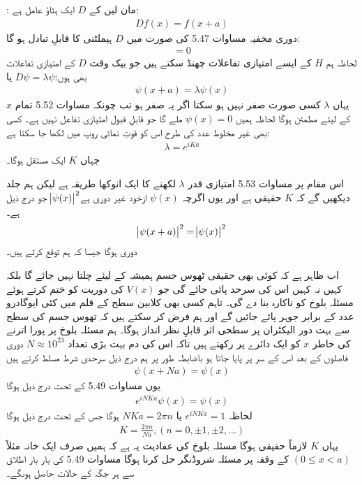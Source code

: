 \documentclass[leqno, b5paper]{khalid-urdu-book}
\begin{document}
: مان لیں کے $D$ ایک ہٹاؤ عامل ہے:
\begin{align}
	Df(x) = f(x+a)
\end{align}
دوری مخفیہ مساوات \num{5.47} کی صورت میں $D$ ہیملٹنی کا قابلِ تبادل ہو گا:
\begin{align}
	[D, H] = 0
\end{align}
لحاظہ ہم $H$ کے ایسے امتیازی تفاعلات چھنڈ سکتے ہیں جو بیک وقت $D$ کے امتیازی تفاعلات بھی ہوں:\(D\psi = \lambda\psi\) یا
\begin{align}
	\psi(x+a) = \lambda\psi(x)
\end{align}
یہاں $\lambda$ کسی صورت صفر نہیں ہو سکتا اگر یہ صفر ہو تب چونکہ مساوات \num{5.52} تمام $x$ کے لیئے مطمئن ہوگا لحاظہ ہمیں \(\psi(x) = 0\) ملے گا جو قابلِ قبول امتیازی تفاعل نہیں ہے۔ کسی بھی غیر مخلوط عدد کی طرح اس کو قوتِ نمائی روپ میں لکھا جا سکتا ہے: 
\begin{align}
	\lambda = e^{iKa}
\end{align}
جہاں $K$ ایک مستقل ہوگا۔

اس مقام پر مساوات \num{5.53} امتیازی قدر $\lambda$ لکھنے کا ایک انوکھا طریقہ ہے لیکن ہم جلد دیکھیں گے کہ $K$ حقیقی ہے اور یوں اگرچہ $\psi(x)$ ازخود غیر دوری ہے\(\abs{\psi(x)}^{2}\) جو درج ذیل ہے۔
\begin{align}
	\abs{\psi(x+a)}^{2} = \abs{\psi(x)}^{2}
\end{align}
دوری ہوگا جیسا کہ ہم توقع کرتے ہیں۔

اب ظاہر ہے کہ کوئی بھی حقیقی ٹھوس جسم ہمیشہ کے لیئے چلتا نہیں جائے گا بلکہ کہیں نہ کہیں اس کی سرحد پائی جائے گی جو $V(x)$ کی دوریت کو ختم کرتے ہوئے مسئلہ بلوخ کو ناکارہ بنا دے گی۔ تاہم کسی بھی کلابین سطح کے  قلم میں کئی ایوگادرو عدد کے برابر جوہر پائے جائیں گے اور ہم فرض کر سکتے ہیں کہ تھوس جسم کی سطح سے بہت دور الیکٹران پر سطحی اثر قابلِ نظر انداز ہوگا۔ ہم مسئلہ بلوخ پر پورا اترنے کی خاطر $x$ کو ایک دائرے پر رکھتے ہیں تاکہ اس کی دم بہت بڑی تعداد \(N\approx10^{23}\) دوری فاصلوں کے بعد اس کے سر پر پایا جاتا ہو باضابطہ طور پر ہم درج ذیل سرحدی شرط مسلط کرتے ہیں   
\begin{align}
	\psi(x+Na) = \psi(x)
\end{align}
یوں مساوات \num{5.49} کے تحت درج ذیل ہوگا
\begin{align*}
	e^{iNKa}\psi(x) = \psi(x)
\end{align*}
لحاظہ \(e^{iNKa} = 1\) یا \(NKa = 2\pi n\) ہوگا جس کے تحت درج ذیل ہوگا 
\begin{align}
	K = \frac{2\pi n}{Na}, (n = 0, \pm1, \pm2, \dots)
\end{align}
یہاں $K$ لازماً حقیقی ہوگا مسئلہ بلوخ کی عفادیت یہ ہے کہ ہمیں صرف ایک خانہ مثلاً \((0\leq x<a)\) کے وقفہ پر مسئلہ شروڈنگر حل کرنا ہوگا مساوات \num{5.49} کی بار بار اطلاق سے ہر جگہ کے حالات  حاصل ہوںگے۔
\end{document}
